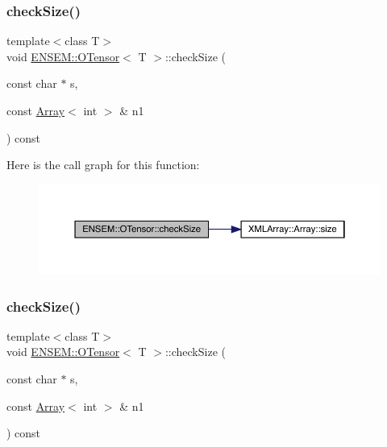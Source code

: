 \mbox{\label{classENSEM_1_1OTensor_ac59e6465eb9803b05edcdec04f8d2370}} 
\subsubsection{\texorpdfstring{checkSize()}{checkSize()}\hspace{0.1cm}{\footnotesize\ttfamily [4/6]}}
{\footnotesize\ttfamily template$<$class T$>$ \\
void \mbox{\hyperlink{classENSEM_1_1OTensor}{E\+N\+S\+E\+M\+::\+O\+Tensor}}$<$ T $>$\+::check\+Size (\begin{DoxyParamCaption}\item[{const char $\ast$}]{s,  }\item[{const \mbox{\hyperlink{classXMLArray_1_1Array}{Array}}$<$ int $>$ \&}]{n1 }\end{DoxyParamCaption}) const\hspace{0.3cm}{\ttfamily [inline]}}

Here is the call graph for this function\+:
\nopagebreak
\begin{figure}[H]
\begin{center}
\leavevmode
\includegraphics[width=350pt]{da/d8a/classENSEM_1_1OTensor_ac59e6465eb9803b05edcdec04f8d2370_cgraph}
\end{center}
\end{figure}
\mbox{\label{classENSEM_1_1OTensor_ac59e6465eb9803b05edcdec04f8d2370}} 
\subsubsection{\texorpdfstring{checkSize()}{checkSize()}\hspace{0.1cm}{\footnotesize\ttfamily [5/6]}}
{\footnotesize\ttfamily template$<$class T$>$ \\
void \mbox{\hyperlink{classENSEM_1_1OTensor}{E\+N\+S\+E\+M\+::\+O\+Tensor}}$<$ T $>$\+::check\+Size (\begin{DoxyParamCaption}\item[{const char $\ast$}]{s,  }\item[{const \mbox{\hyperlink{classXMLArray_1_1Array}{Array}}$<$ int $>$ \&}]{n1 }\end{DoxyParamCaption}) const\hspace{0.3cm}{\ttfamily [inline]}}

